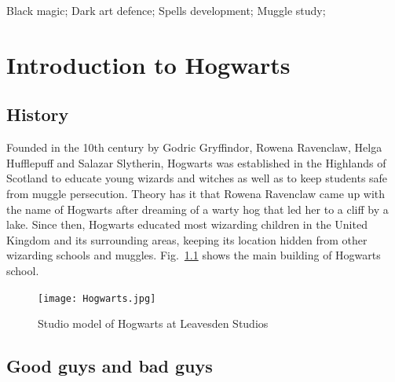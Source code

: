 \documentclass{swfuthesisen}
\begin{document}
\maketitle
\frontmatter

\begin{abstract}
  \lipsum[1-3]
\end{abstract}

\begin{keyword}
  Black magic; Dark art defence; Spells development; Muggle study;
\end{keyword}

\tableofcontents %

\mainmatter

\chapter{Introduction to Hogwarts}
\label{cha:intr-hogw}

\section{History}
\label{sec:history}

Founded in the 10th century by Godric Gryffindor, Rowena Ravenclaw, Helga Hufflepuff and
Salazar Slytherin, Hogwarts was established in the Highlands of Scotland to educate young
wizards and witches as well as to keep students safe from muggle
persecution.\cite{harrypotter} Theory has it that Rowena Ravenclaw came up with the name
of Hogwarts after dreaming of a warty hog that led her to a cliff by a lake. Since then,
Hogwarts educated most wizarding children in the United Kingdom and its surrounding areas,
keeping its location hidden from other wizarding schools and
muggles.\cite{nla.cat-vn992642,nla.cat-vn7290756} Fig.~\ref{fig:hogwarts} shows the main building of Hogwarts school.


\begin{figure}
  \centering%
  \texttt{[image: Hogwarts.jpg]}
  \caption{Studio model of Hogwarts at Leavesden Studios\label{fig:hogwarts}}
\end{figure}

\lipsum[3-6]

\section{Good guys and bad guys}
\end{document}
